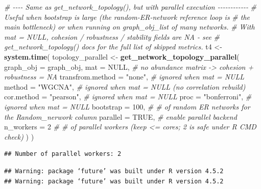 \documentclass[
]{book}
\newenvironment{Shaded}{\begin{snugshade}}{\end{snugshade}}
\newcommand{\AttributeTok}[1]{\textcolor[rgb]{0.13,0.29,0.53}{#1}}
\newcommand{\CommentTok}[1]{\textcolor[rgb]{0.56,0.35,0.01}{\textit{#1}}}
\newcommand{\ConstantTok}[1]{\textcolor[rgb]{0.56,0.35,0.01}{#1}}
\newcommand{\DecValTok}[1]{\textcolor[rgb]{0.00,0.00,0.81}{#1}}
\newcommand{\FunctionTok}[1]{\textcolor[rgb]{0.13,0.29,0.53}{\textbf{#1}}}
\newcommand{\NormalTok}[1]{#1}
\newcommand{\OtherTok}[1]{\textcolor[rgb]{0.56,0.35,0.01}{#1}}
\newcommand{\StringTok}[1]{\textcolor[rgb]{0.31,0.60,0.02}{#1}}
\begin{document}
\begin{Shaded}
\begin{Highlighting}[]
\CommentTok{\# {-}{-}{-}{-} Same as get\_network\_topology(), but with parallel execution {-}{-}{-}{-}{-}{-}{-}{-}{-}{-}{-}{-}}
\CommentTok{\# Useful when \textasciigrave{}bootstrap\textasciigrave{} is large (the random{-}ER{-}network reference loop is}
\CommentTok{\# the main bottleneck) or when running on \textasciigrave{}graph\_obj\_list\textasciigrave{} of many networks.}
\CommentTok{\# With \textasciigrave{}mat = NULL\textasciigrave{}, cohesion / robustness / stability fields are NA {-} see}
\CommentTok{\# get\_network\_topology() docs for the full list of skipped metrics.}
\NormalTok{t4 }\OtherTok{\textless{}{-}} \FunctionTok{system.time}\NormalTok{(}
\NormalTok{  topology\_parallel }\OtherTok{\textless{}{-}} \FunctionTok{get\_network\_topology\_parallel}\NormalTok{(}
    \AttributeTok{graph\_obj        =}\NormalTok{ graph\_obj,}
    \AttributeTok{mat              =} \ConstantTok{NULL}\NormalTok{,           }\CommentTok{\# no abundance matrix {-}\textgreater{} cohesion + robustness = NA}
    \AttributeTok{transfrom.method =} \StringTok{"none"}\NormalTok{,         }\CommentTok{\# ignored when mat = NULL}
    \AttributeTok{method           =} \StringTok{"WGCNA"}\NormalTok{,        }\CommentTok{\# ignored when mat = NULL (no correlation rebuild)}
    \AttributeTok{cor.method       =} \StringTok{"pearson"}\NormalTok{,      }\CommentTok{\# ignored when mat = NULL}
    \AttributeTok{proc             =} \StringTok{"bonferroni"}\NormalTok{,   }\CommentTok{\# ignored when mat = NULL}
    \AttributeTok{bootstrap        =} \DecValTok{100}\NormalTok{,            }\CommentTok{\# \# of random ER networks for the Random\_nerwork column}
    \AttributeTok{parallel         =} \ConstantTok{TRUE}\NormalTok{,           }\CommentTok{\# enable parallel backend}
    \AttributeTok{n\_workers        =} \DecValTok{2}               \CommentTok{\# \# of parallel workers (keep \textless{}= cores; 2 is safe under R CMD check)}
\NormalTok{  )}
\NormalTok{)}
\end{Highlighting}
\end{Shaded}

\begin{verbatim}
## Number of parallel workers: 2
\end{verbatim}

\begin{verbatim}
## Warning: package ‘future’ was built under R version 4.5.2
## Warning: package ‘future’ was built under R version 4.5.2
\end{verbatim}
\end{document}
